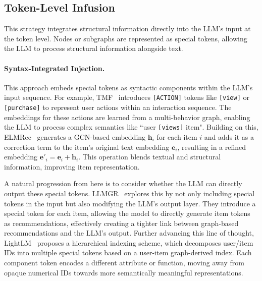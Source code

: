 


\subsection{Token-Level Infusion}
\label{subsec:token-injection}

This strategy integrates structural information directly into the LLM's input at the token level. Nodes or subgraphs are represented as special tokens, allowing the LLM to process structural information alongside text.

\paragraph{Syntax-Integrated Injection.} This approach embeds special tokens as syntactic components within the LLM's input sequence. For example, TMF~\cite{ma2024triple} introduces \texttt{[ACTION]} tokens like \texttt{[view]} or \texttt{[purchase]} to represent user actions within an interaction sequence. The embeddings for these actions are learned from a multi-behavior graph, enabling the LLM to process complex semantics like ``user \texttt{[views]} item". Building on this, ELMRec~\cite{wang2024enhancing} generates a GCN-based embedding $\mathbf{h}_i$ for each item $i$ and adds it as a correction term to the item's original text embedding $\mathbf{e}_i$, resulting in a refined embedding $\mathbf{e'}_i = \mathbf{e}_i + \mathbf{h}_i$. This operation blends textual and structural information, improving item representation.

A natural progression from here is to consider whether the LLM can directly output these special tokens. LLMGR~\cite{guo2024integrating} explores this by not only including special tokens in the input but also modifying the LLM's output layer. They introduce a special token for each item, allowing the model to directly generate item tokens as recommendations, effectively creating a tighter link between graph-based recommendations and the LLM's output. Further advancing this line of thought, LightLM~\cite{mei2023lightlm} proposes a hierarchical indexing scheme, which decomposes user/item IDs into multiple special tokens based on a user-item graph-derived index. Each component token encodes a different attribute or function, moving away from opaque numerical IDs towards more semantically meaningful representations.

